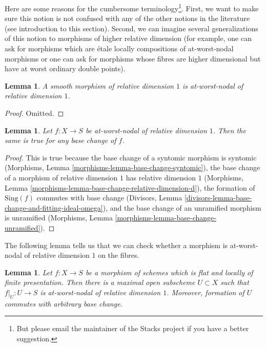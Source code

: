 \documentclass{stacks-project}
\theoremstyle{plain}
\newtheorem{lemma}[subsection]{Lemma}
\theoremstyle{definition}
\theoremstyle{remark}
\numberwithin{equation}{subsection}
\begin{document}
\noindent
Here are some reasons for the cumbersome terminology\footnote{But please
email the maintainer of the Stacks project if you have a better suggestion.}.
First, we want to make sure this notion is not confused with any of the
other notions in the literature (see introduction to this section).
Second, we can imagine several generalizations of this notion to morphisms
of higher relative dimension (for example, one can ask for morphisms
which are \'etale locally compositions of at-worst-nodal morphisms or
one can ask for morphisms whose fibres are higher dimensional but have
at worst ordinary double points).

\begin{lemma}
\label{lemma-smooth-relative-dimension-1}
A smooth morphism of relative dimension $1$ is
at-worst-nodal of relative dimension $1$.
\end{lemma}

\begin{proof}
Omitted.
\end{proof}

\begin{lemma}
\label{lemma-base-change-nodal-family}
Let $f : X \to S$ be at-worst-nodal of relative dimension $1$.
Then the same is true for any base change of $f$.
\end{lemma}

\begin{proof}
This is true because the base change of a syntomic morphism
is syntomic (Morphisms, Lemma \ref{morphisms-lemma-base-change-syntomic}),
the base change of a morphism of relative dimension $1$ has
relative dimension $1$
(Morphisms, Lemma \ref{morphisms-lemma-base-change-relative-dimension-d}),
the formation of $\text{Sing}(f)$ commutes with base change
(Divisors, Lemma
\ref{divisors-lemma-base-change-and-fitting-ideal-omega}), and
the base change of an unramified morphism is unramified
(Morphisms, Lemma \ref{morphisms-lemma-base-change-unramified}).
\end{proof}

\noindent
The following lemma tells us that we can check whether a morphism
is at-worst-nodal of relative dimension $1$ on the fibres.

\begin{lemma}
\label{lemma-locus-where-nodal}
Let $f : X \to S$ be a morphism of schemes which is flat and
locally of finite presentation. Then there is a maximal open
subscheme $U \subset X$ such that $f|_U : U \to S$ is
at-worst-nodal of relative dimension $1$. Moreover, formation
of $U$ commutes with arbitrary base change.
\end{lemma}
\end{document}
